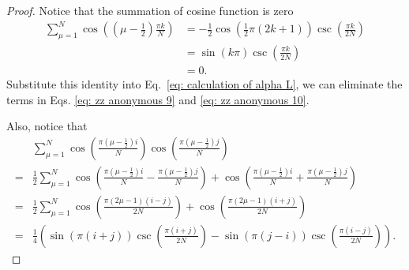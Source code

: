 \documentclass[journal=jctcce,a4paper,manuscript=article]{achemso}
\begin{document}
\begin{proof}
  Notice that the summation of cosine function is zero
  \begin{equation}
    \begin{aligned}
      \sum_{\mu=1}^{N} \cos\left(\left(\mu-\frac{1}{2}\right) \frac{\pi k}{N}\right) & =-\frac{1}{2} \cos \left(\frac{1}{2} \pi(2 k+1)\right) \csc \left(\frac{\pi k}{2 N}\right) \\
                                                                                     & =\sin (k \pi) \csc \left(\frac{\pi k}{2 N}\right)                                          \\
                                                                                     & =0.
    \end{aligned}
  \end{equation}
  Substitute this identity into Eq.~\eqref{eq: calculation of alpha L}, we can eliminate the terms in Eqs. \eqref{eq: zz anonymous 9} and \eqref{eq: zz anonymous 10}.

  Also, notice that
  \begin{equation}
    \label{eq: zz anonymous 12}
    \begin{aligned}
        & \sum_{\mu=1}^{N} \cos \left(\frac{\pi\left(\mu-\frac{1}{2}\right) i}{N}\right) \cos \left(\frac{\pi\left(\mu-\frac{1}{2}\right) j}{N}\right)                                                                                                     \\
      = & \frac{1}{2} \sum_{\mu=1}^{N} \cos \left(\frac{\pi\left(\mu-\frac{1}{2}\right) i}{N}-\frac{\pi\left(\mu-\frac{1}{2}\right) j}{N}\right)+\cos \left(\frac{\pi\left(\mu-\frac{1}{2}\right) i}{N}+\frac{\pi\left(\mu-\frac{1}{2}\right) j}{N}\right) \\
      = & \frac{1}{2} \sum_{\mu=1}^{N} \cos \left(\frac{\pi(2 \mu-1)(i-j)}{2 N}\right)+\cos \left(\frac{\pi(2 \mu-1)(i+j)}{2 N}\right)                                                                                                                     \\
      = & \frac{1}{4}\left(\sin (\pi(i+j)) \csc \left(\frac{\pi(i+j)}{2 N}\right)-\sin (\pi(j-i)) \csc \left(\frac{\pi(i-j)}{2 N}\right)\right).
    \end{aligned}
  \end{equation}


\end{proof}
\end{document}
